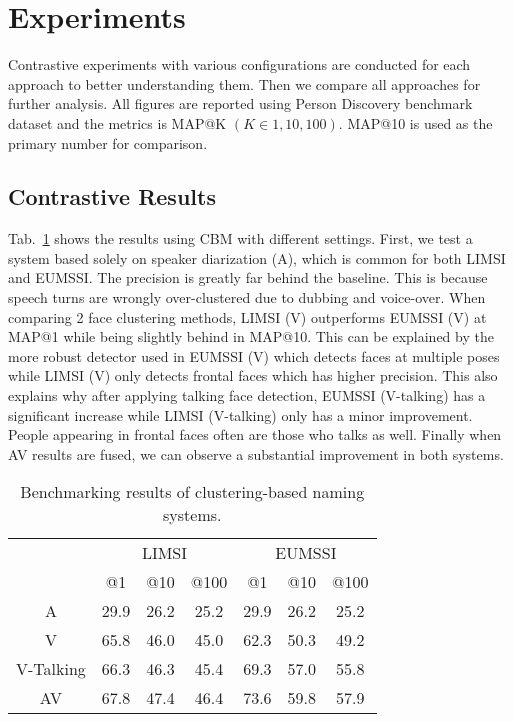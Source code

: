 \section{Experiments}
\label{sec:experiment}

Contrastive experiments with various configurations are conducted for each approach to better understanding them. Then we compare all approaches for further analysis. All figures are reported using Person Discovery benchmark dataset and the metrics is MAP@K $(K \in {1, 10, 100})$. MAP@10 is used as the primary number for comparison.

\subsection{Contrastive Results}

 Tab.~\ref{tab:clustering} shows the results using CBM with different settings. First, we test a system based solely on speaker diarization (A), which is common for both LIMSI and EUMSSI. The precision is greatly far behind the baseline. This is because speech turns are wrongly over-clustered due to dubbing and voice-over.
%
When comparing 2 face clustering methods, LIMSI (V) outperforms EUMSSI (V) at MAP@1 while being slightly behind in MAP@10. This can be explained by the more robust detector used in EUMSSI (V) which detects faces at multiple poses while LIMSI (V) only detects frontal faces which has higher precision.
%
This also explains why after applying talking face detection, EUMSSI (V-talking) has a significant increase while LIMSI (V-talking) only has a minor improvement. People appearing in frontal faces often are those who talks as well.
%
Finally when AV results are fused, we can observe a substantial improvement in both systems.

\begin{table}[tb]
\centering
\caption{Benchmarking results of clustering-based naming systems.}
\vspace*{-2mm}
\begin{tabular}{c|c|c|c|| c|c|c|}
\cline{2-7}
  &  \multicolumn{3}{|c||}{LIMSI} &  \multicolumn{3}{|c|}{EUMSSI} \\ \cline{2-7}
           & @1& @10& @100   & @1& @10& @100 \\ \hline
 \multicolumn{1}{|c|}{A} & 29.9   & 26.2   & 25.2  & 29.9   & 26.2   & 25.2\\ \hline
 \multicolumn{1}{|c|}{V} & 65.8   & 46.0   & 45.0 & 62.3   & 50.3   & 49.2 \\ \hline
 \multicolumn{1}{|c|}{V-Talking} & 66.3   & 46.3   & 45.4 & 69.3   & 57.0   & 55.8 \\ \hline
 \multicolumn{1}{|c|}{AV} & 67.8   & 47.4   & 46.4 & 73.6   & 59.8   & 57.9\\ \hline
\end{tabular}
%
\vspace*{-5mm}
\label{tab:clustering}
\end{table}


